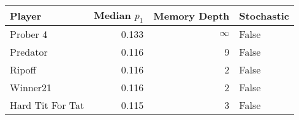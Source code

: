 \begin{tabular}{lrrl}
\toprule
           Player &  Median $p_1$ &  Memory Depth & Stochastic \\
\midrule
         Prober 4 &         0.133 &            \(\infty\) &      False \\
         Predator &         0.116 &             9 &      False \\
           Ripoff &         0.116 &             2 &      False \\
         Winner21 &         0.116 &             2 &      False \\
 Hard Tit For Tat &         0.115 &             3 &      False \\
\bottomrule
\end{tabular}
